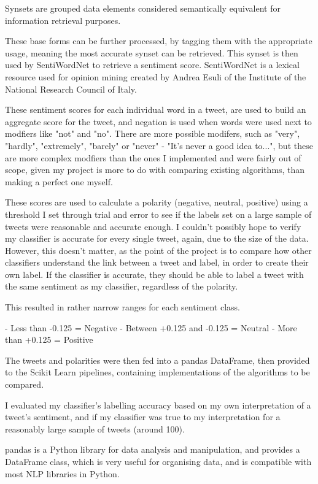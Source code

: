 \documentclass{article}
\begin{document}
Synsets are grouped data elements considered semantically equivalent for information retrieval purposes.

These base forms can be further processed, by tagging them with the appropriate usage, meaning the most accurate synset can be retrieved.
This synset is then used by SentiWordNet to retrieve a sentiment score.
SentiWordNet is a lexical resource used for opinion mining created by Andrea Esuli of the Institute of the National Research Council of Italy.

These sentiment scores for each individual word in a tweet, are used to build an aggregate score for the tweet, and negation is used when words were used next to modfiers like "not" and "no".
There are more possible modifers, such as "very", "hardly", "extremely", "barely" or "never" - "It's never a good idea to...", but these are more complex modfiers than the ones I implemented and were fairly out of scope, given my project is more to do with comparing existing algorithms, than making a perfect one myself.

These scores are used to calculate a polarity (negative, neutral, positive) using a threshold I set through trial and error to see if the labels set on a large sample of tweets were reasonable and accurate enough.
I couldn't possibly hope to verify my classifier is accurate for every single tweet, again, due to the size of the data.
However, this doesn't matter, as the point of the project is to compare how other classifiers understand the link between a tweet and label, in order to create their own label.
If the classifier is accurate, they should be able to label a tweet with the same sentiment as my classifier, regardless of the polarity.

This resulted in rather narrow ranges for each sentiment class.

- Less than -0.125 = Negative
- Between +0.125 and -0.125 = Neutral
- More than +0.125 = Positive

The tweets and polarities were then fed into a pandas DataFrame, then provided to the Scikit Learn pipelines, containing implementations of the algorithms to be compared.

I evaluated my classifier's labelling accuracy based on my own interpretation of a tweet's sentiment, and if my classifier was true to my interpretation for a reasonably large sample of tweets (around 100).

pandas is a Python library for data analysis and manipulation, and provides a DataFrame class, which is very useful for organising data, and is compatible with most NLP libraries in Python.
\end{document}
